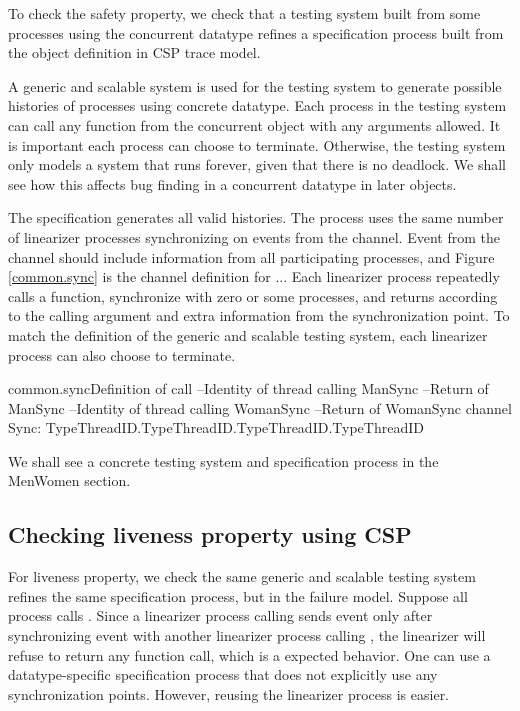 \documentclass{article}
\begin{document}
To check the safety property, we check that a testing system built from some processes using the concurrent datatype refines a specification process built from the object definition in CSP trace model.

A generic and scalable system is used for the testing system to generate possible histories of processes using concrete datatype. Each process in the testing system can call any function from the concurrent object with any arguments allowed. It is important each process can choose to terminate. Otherwise, the testing system only models a system that runs forever, given that there is no deadlock. We shall see how this affects bug finding in a concurrent datatype in later objects.

The specification generates all valid histories. The process uses the same number of linearizer processes synchronizing on events from the  channel. Event from the  channel should include information from all participating processes, and Figure \ref{common.sync} is the  channel definition for ... Each linearizer process repeatedly calls a function, synchronize with zero or some processes, and returns according to the calling argument and extra information from the synchronization point. To match the definition of the generic and scalable testing system, each linearizer process can also choose to terminate. 

\begin{cspinline}{common.sync}{Definition of call}
--Identity of thread calling ManSync
--Return of ManSync
--Identity of thread calling WomanSync
--Return of WomanSync
channel Sync: TypeThreadID.TypeThreadID.TypeThreadID.TypeThreadID
\end{cspinline}
  
We shall see a concrete testing system and specification process in the MenWomen section. 

\subsection{Checking liveness property using CSP}
For liveness property, we check the same generic and scalable testing system refines the same specification process, but in the failure model. Suppose all process calls . Since a linearizer process calling  sends  event only after synchronizing  event with another linearizer process calling , the linearizer will refuse to return any function call, which is a expected behavior. One can use a datatype-specific specification process that does not explicitly use any synchronization points. However, reusing the linearizer process is easier. 
\end{document}
